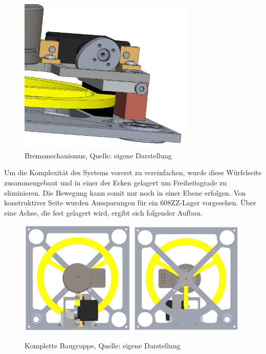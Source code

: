 \begin{figure}[h!]
	\begin{center}
	\includegraphics[width=0.75\textwidth]{img/Bremse_detail.png}
	\end{center}
	\caption{Bremsmechanismus, Quelle: eigene Darstellung}
	\end{figure} 

\newpage
Um die Komplexität des Systems vorerst zu vereinfachen, wurde diese Würfelseite zusammengebaut und in einer der Ecken gelagert um  Freiheitsgrade zu eliminieren. 
Die Bewegung kann somit nur noch in einer Ebene erfolgen. Von konstruktiver Seite wurden Aussparungen für ein 608ZZ-Lager vorgesehen. Über eine Achse, die fest gelagert wird, ergibt sich folgender Aufbau. 

\begin{figure}[h!]
	\includegraphics[width=0.49\textwidth]		  {img/1d_assembled_top}	   \includegraphics[width=0.49\textwidth]{img/1d_assembled_bottom}								\caption{Komplette Baugruppe, Quelle: eigene Darstellung} 
	\end{figure} 

